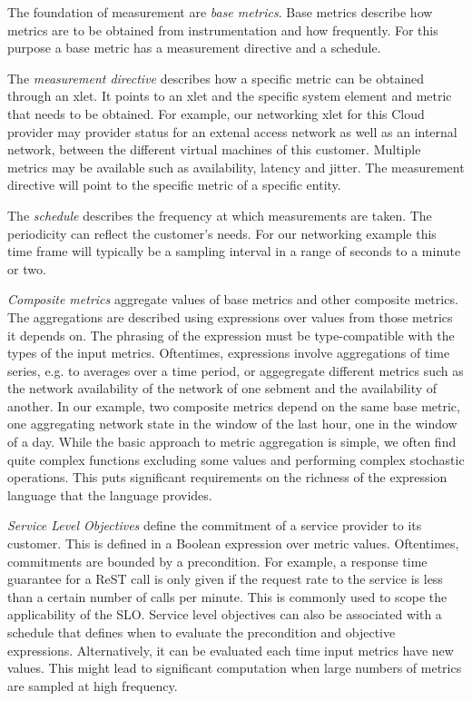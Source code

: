 The foundation of measurement are {\em base metrics}. Base metrics describe how metrics are to be obtained from instrumentation and how frequently. For this purpose a base metric has a measurement directive and a schedule.

The {\em measurement directive} describes how a specific metric can be obtained through an xlet. It points to an xlet and the specific system element and metric that needs to be obtained. For example, our networking xlet for this Cloud provider may provider status for an extenal access network as well as an internal network, between the different virtual machines of this customer. Multiple metrics may be available such as availability, latency and jitter. The measurement directive will point to the specific metric of a specific entity.

The {\em schedule} describes the frequency at which measurements are taken. The periodicity can reflect the customer's needs. For our networking example this time frame will typically be a sampling interval in a range of seconds to a minute or two.

{\em Composite metrics} aggregate values of base metrics and other composite metrics. The aggregations are described using expressions over values from those metrics it depends on. The phrasing of the expression must be type-compatible with the types of the input metrics. Oftentimes, expressions involve aggregations of time series, e.g. to averages over a time period, or aggegregate different metrics such as the network availability of the network of one sebment and the availability of another. In our example, two composite metrics depend on the same base metric, one aggregating network state in the window of the last hour, one in the window of a day. While the basic approach to metric aggregation is simple, we often find quite complex functions excluding some values and performing complex stochastic operations. This puts significant requirements on the richness of the expression language that the language provides.

{\em Service Level Objectives} define the commitment of a service provider to its customer. This is defined in a Boolean expression over metric values. Oftentimes, commitments are bounded by a precondition. For example, a response time guarantee for a ReST call is only given if the request rate to the service is less than a certain number of calls per minute. This is commonly used to scope the applicability of the SLO. Service level objectives can also be associated with a schedule that defines when to evaluate the precondition and objective expressions. Alternatively, it can be evaluated each time input metrics have new values. This might lead to significant computation when large numbers of metrics are sampled at high frequency.

